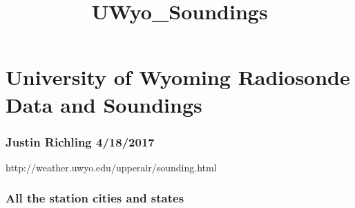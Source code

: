 \documentclass[11pt]{article}
\title{UWyo\_Soundings}
\begin{document}
    
    
    \maketitle
    
    

    
    \hypertarget{university-of-wyoming-radiosonde-data-and-soundings}{%
\section{University of Wyoming Radiosonde Data and
Soundings}\label{university-of-wyoming-radiosonde-data-and-soundings}}

    \hypertarget{justin-richling-4182017}{%
\subsubsection{Justin Richling
4/18/2017}\label{justin-richling-4182017}}

    http://weather.uwyo.edu/upperair/sounding.html

    \hypertarget{all-the-station-cities-and-states}{%
\subsubsection{All the station cities and
states}\label{all-the-station-cities-and-states}}
\end{document}

